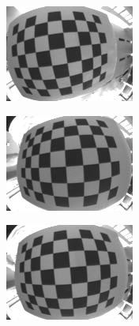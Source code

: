 \begin{figure}[h!]
\begin{subfigure}[b]{0.2\textwidth}
        \includegraphics[width=\textwidth]{images/camera/2.png}
    \end{subfigure}
	\begin{subfigure}[b]{0.2\textwidth}
        \centering
        \includegraphics[width=\textwidth]{images/camera/3.png}
    \end{subfigure}
	\begin{subfigure}[b]{0.2\textwidth}
        \centering
        \includegraphics[width=\textwidth]{images/camera/4.png}

\end{subfigure}
\end{figure}
